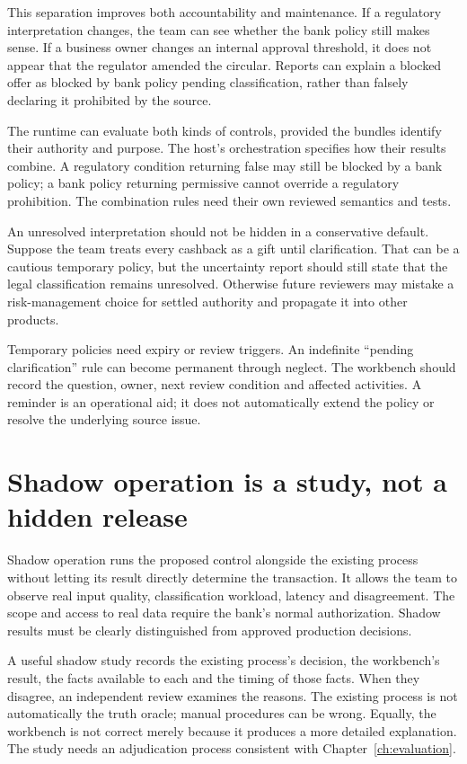 This separation improves both accountability and maintenance. If a regulatory
interpretation changes, the team can see whether the bank policy still makes sense.
If a business owner changes an internal approval threshold, it does not appear
that the regulator amended the circular. Reports can explain a blocked offer as
blocked by bank policy pending classification, rather than falsely declaring it
prohibited by the source.

The runtime can evaluate both kinds of controls, provided the bundles identify
their authority and purpose. The host's orchestration specifies how their results
combine. A regulatory condition returning false may still be blocked by a bank
policy; a bank policy returning permissive cannot override a regulatory
prohibition. The combination rules need their own reviewed semantics and tests.

An unresolved interpretation should not be hidden in a conservative default.
Suppose the team treats every cashback as a gift until clarification. That can be
a cautious temporary policy, but the uncertainty report should still state that
the legal classification remains unresolved. Otherwise future reviewers may
mistake a risk-management choice for settled authority and propagate it into
other products.

Temporary policies need expiry or review triggers. An indefinite ``pending
clarification'' rule can become permanent through neglect. The workbench should
record the question, owner, next review condition and affected activities. A
reminder is an operational aid; it does not automatically extend the policy or
resolve the underlying source issue.

\section{Shadow operation is a study, not a hidden release}

Shadow operation runs the proposed control alongside the existing process without
letting its result directly determine the transaction. It allows the team to
observe real input quality, classification workload, latency and disagreement.
The scope and access to real data require the bank's normal authorization.
Shadow results must be clearly distinguished from approved production decisions.

A useful shadow study records the existing process's decision, the workbench's
result, the facts available to each and the timing of those facts. When they
disagree, an independent review examines the reasons. The existing process is not
automatically the truth oracle; manual procedures can be wrong. Equally, the
workbench is not correct merely because it produces a more detailed explanation.
The study needs an adjudication process consistent with Chapter~\ref{ch:evaluation}.

